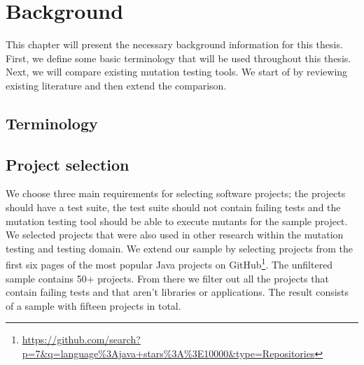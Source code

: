 \documentclass[../main]{subfiles}
\begin{document}
\chapter{Background}
\label{ch:background}
This chapter will present the necessary background information for this thesis. First, we define some basic terminology that will be used throughout this thesis.
Next, we will compare existing mutation testing tools. We start of by reviewing existing literature and then extend the comparison. 
\section{Terminology}
\section{Project selection}
\label{ch:project_selection}
We choose three main requirements for selecting software projects; the projects should have a test suite, the test suite should not contain failing tests and the mutation testing tool should be able to execute mutants for the sample project.
We selected projects that were also used in other research within the mutation testing and testing domain\cite{Pizzoleto2019,Yu2019PossibilityScope,Wei2021SpectralTesting, Zhang2019PredictiveTesting, Chen2018SpeedingStudy, Laurent2017AssessingPIT}.
We extend our sample by selecting projects from the first six pages of the most popular Java projects on GitHub\footnote{\url{https://github.com/search?p=7&q=language\%3Ajava+stars\%3A\%3E10000&type=Repositories}}.
The unfiltered sample contains 50+ projects.
From there we filter out all the projects that contain failing tests and that aren't libraries or applications.
The result consists of a sample with fifteen projects in total.
\end{document}
